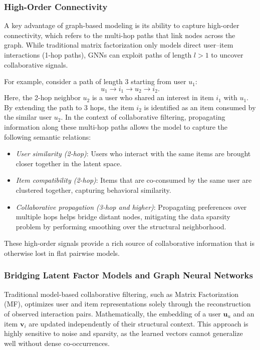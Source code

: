 \subsubsection{High-Order Connectivity}

A key advantage of graph-based modeling is its ability to capture high-order connectivity, which refers to the multi-hop paths that link nodes across the graph. While traditional matrix factorization only models direct user--item interactions (1-hop paths), GNNs can exploit paths of length \(l > 1\) to uncover collaborative signals. 

For example, consider a path of length 3 starting from user \(u_1\):
\begin{equation}
    u_1 \rightarrow i_1 \rightarrow u_2 \rightarrow i_2.
    \label{eq:three_hop_path}
\end{equation}
Here, the 2-hop neighbor \(u_2\) is a user who shared an interest in item \(i_1\) with \(u_1\). By extending the path to 3 hops, the item \(i_2\) is identified as an item consumed by the similar user \(u_2\). In the context of collaborative filtering, propagating information along these multi-hop paths allows the model to capture the following semantic relations:
\begin{itemize}
    \item \textit{User similarity (2-hop)}: Users who interact with the same items are brought closer together in the latent space.
    \item \textit{Item compatibility (2-hop)}: Items that are co-consumed by the same user are clustered together, capturing behavioral similarity.
    \item \textit{Collaborative propagation (3-hop and higher)}: Propagating preferences over multiple hops helps bridge distant nodes, mitigating the data sparsity problem by performing smoothing over the structural neighborhood.
\end{itemize}
These high-order signals provide a rich source of collaborative information that is otherwise lost in flat pairwise models.

\subsubsection{Bridging Latent Factor Models and Graph Neural Networks}

Traditional model-based collaborative filtering, such as Matrix Factorization (MF), optimizes user and item representations solely through the reconstruction of observed interaction pairs. Mathematically, the embedding of a user \(\mathbf{u}_u\) and an item \(\mathbf{v}_i\) are updated independently of their structural context. This approach is highly sensitive to noise and sparsity, as the learned vectors cannot generalize well without dense co-occurrences.

